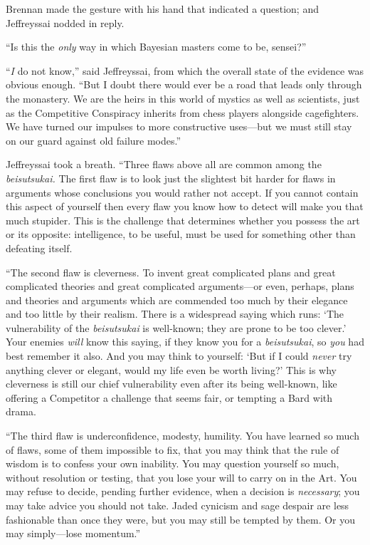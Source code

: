 {
 Brennan made the gesture with his hand that indicated a question;
and Jeffreyssai nodded in reply.}

{
 ``Is this the \textit{only} way in which Bayesian
masters come to be, sensei?''}

{
 ``\textit{I} do not know,''
said Jeffreyssai, from which the overall state of the evidence was
obvious enough. ``But I doubt there would ever be a
road that leads only through the monastery. We are the heirs in this
world of mystics as well as scientists, just as the Competitive
Conspiracy inherits from chess players alongside cagefighters. We have
turned our impulses to more constructive uses---but we must still stay
on our guard against old failure modes.''}

{
 Jeffreyssai took a breath. ``Three flaws above
all are common among the \textit{beisutsukai.} The first flaw is to
look just the slightest bit harder for flaws in arguments whose
conclusions you would rather not accept. If you cannot contain this
aspect of yourself then every flaw you know how to detect will make you
that much stupider. This is the challenge that determines whether you
possess the art or its opposite: intelligence, to be useful, must be
used for something other than defeating itself.}

{
 ``The second flaw is cleverness. To invent great
complicated plans and great complicated theories and great complicated
arguments---or even, perhaps, plans and theories and arguments which
are commended too much by their elegance and too little by their
realism. There is a widespread saying which runs: `The
vulnerability of the \textit{beisutsukai} is well-known; they are prone
to be too clever.' Your enemies \textit{will} know this
saying, if they know you for a \textit{beisutsukai}, so \textit{you}
had best remember it also. And you may think to yourself:
`But if I could \textit{never} try anything clever or
elegant, would my life even be worth living?' This is
why cleverness is still our chief vulnerability even after its being
well-known, like offering a Competitor a challenge that seems fair, or
tempting a Bard with drama.}

{
 ``The third flaw is underconfidence, modesty,
humility. You have learned so much of flaws, some of them impossible to
fix, that you may think that the rule of wisdom is to confess your own
inability. You may question yourself so much, without resolution or
testing, that you lose your will to carry on in the Art. You may refuse
to decide, pending further evidence, when a decision is
\textit{necessary}; you may take advice you should not take. Jaded
cynicism and sage despair are less fashionable than once they were, but
you may still be tempted by them. Or you may simply---lose
momentum.''}

